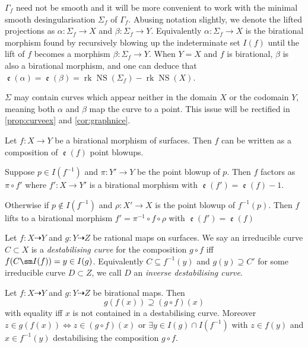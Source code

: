 \documentclass[11pt, final]{amsart}
\newcommand{\dashto}{\dashrightarrow}
\newcommand{\nin}{\notin}
\newcommand{\sgraph}{\Sigma}
\DeclareMathOperator{\NS}{NS}
\DeclareMathOperator{\rk}{rk}
\DeclareMathOperator{\comp}{\mathfrak e}
\begin{document}
$\Gamma_{\!f}$ need not be smooth and it will be more convenient to work with the minimal smooth desingularisation $\sgraph_{\!f}$ of $\Gamma_{\!f}$. Abusing notation slightly, we denote the lifted projections as $\alpha : \sgraph_{\!f} \to X$ and $\beta : \sgraph_{\!f} \to Y$. Equivalently $\alpha : \sgraph_{\!f} \to X$ is the birational morphism found by recursively blowing up the indeterminate set $I(f)$ until the lift of $f$ becomes a morphism $\beta : \sgraph_{\!f} \to Y$. When $Y = X$ and $f$ is birational, $\beta$ is also a birational morphism, and one can deduce that $\comp(\alpha) = \comp(\beta) = \rk\NS(\sgraph_{\!f}) - \rk\NS(X)$.

\begin{rmk}[Warning]
 $\sgraph$ may contain curves which appear neither in the domain $X$ or the codomain $Y$, meaning both $\alpha$ and $\beta$ map the curve to a point. This issue will be rectified in \autoref{prop:curveex} and \autoref{cor:graphnice}.
\end{rmk}

\begin{prop}\label{prop:factorblowup}
 Let $f : X \to Y$ be a birational morphism of surfaces. Then $f$ can be written as a composition of $\comp(f)$ point blowups.%
 
 Suppose $p \in I(f^{-1})$ and $\pi : Y' \to Y$ be the point blowup of $p$. Then $f$ factors as $\pi \circ f'$ where $f': X \to Y'$ is a birational morphism with $\comp(f') = \comp(f) -1$.
 
 Otherwise if $p \nin I(f^{-1})$ and $\rho : X' \to X$ is the point blowup of $f^{-1}(p)$. Then $f$ lifts to a birational morphism $f' = \pi^{-1} \circ f \circ \rho$ with $\comp(f') = \comp(f)$
\end{prop}

\begin{defn}
Let $f : X \dashrightarrow Y$ and $g : Y \dashrightarrow Z$ be rational maps on surfaces.
 We say an irreducible curve $C \subset X$ is a \emph{destabilising curve} for the composition $g \circ f$ iff $f(C\sm I(f)) = y \in I(g)$. Equivalently $C \subseteq f^{-1}(y)$ and $g(y) \supseteq C'$ for some irreducible curve $D \subset Z$, we call $D$ an \emph{inverse destabilising curve}.
 \end{defn}
 
 \begin{prop}\label{prop:graphcomp}
 Let $f : X \dashto Y$ and $g : Y \dashto Z$ be birational maps. Then \[g(f(x)) \supseteq (g\circ f)(x)\] with equality iff $x$ is not contained in a destabilising curve. Moreover $z \in g(f(x)) \iff z \in (g\circ f)(x)$ or $\exists y \in I(g)\cap I(f^{-1})$ with $z \in f(y)$ and $x \in f^{-1}(y)$ destabilising the composition $g\circ f$.
\end{prop}
\end{document}
